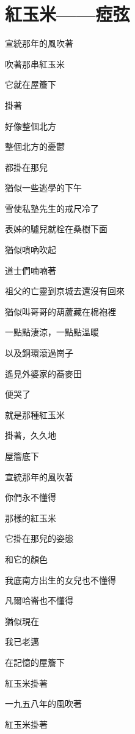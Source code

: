 \section{紅玉米——瘂弦}

宣統那年的風吹著

吹著那串紅玉米

 

它就在屋簷下

掛著

好像整個北方

整個北方的憂鬱

都掛在那兒

 

猶似一些逃學的下午

雪使私塾先生的戒尺冷了

表姊的驢兒就栓在桑樹下面

 

猶似嗩吶吹起

道士們喃喃著

祖父的亡靈到京城去還沒有回來

 

猶似叫哥哥的葫蘆藏在棉袍裡

一點點淒涼，一點點溫暖

以及銅環滾過崗子

 

遙見外婆家的蕎麥田

便哭了

 

就是那種紅玉米

掛著，久久地

屋簷底下

宣統那年的風吹著

 

你們永不懂得

那樣的紅玉米

 

它掛在那兒的姿態

和它的顏色

我底南方出生的女兒也不懂得

凡爾哈崙也不懂得

 

猶似現在

我已老邁

在記憶的屋簷下

紅玉米掛著

一九五八年的風吹著

紅玉米掛著